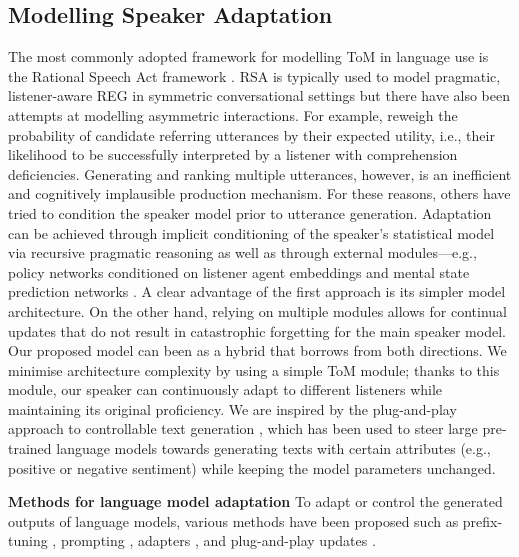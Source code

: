 \subsection{Modelling Speaker Adaptation}
\label{sec:relwork-modelling}
The most commonly adopted framework for modelling ToM in language use is the Rational Speech Act framework \cite{goodman2013knowledge,goodman2016pragmatic}. RSA is typically used to model pragmatic, listener-aware REG in symmetric conversational settings \cite{andreas-klein-2016-reasoning,monroe-etal-2017-colors,cohn-gordon-etal-2018-pragmatically} but there have also been attempts at modelling asymmetric interactions. For example, \citet{bao-etal-2022-learning} reweigh the probability of candidate referring utterances by their expected utility, i.e., their likelihood to be successfully interpreted by a listener with comprehension deficiencies. Generating and ranking multiple utterances, however, is an inefficient and cognitively implausible production mechanism. For these reasons, others have tried to condition the speaker model prior to utterance generation. Adaptation can be achieved through implicit conditioning of the speaker's statistical model via recursive pragmatic reasoning \cite{hawkins2020continual} as well as through external modules---e.g., policy networks conditioned on listener agent embeddings \cite{corona2019modeling} and mental state prediction networks \cite{bara-etal-2021-mindcraft,zhu2021few}. A clear advantage of the first approach is its simpler model architecture. On the other hand, relying on multiple modules allows for continual updates that do not result in catastrophic forgetting for the main speaker model. Our proposed model can been as a hybrid that borrows from both directions. We minimise architecture complexity by using a simple ToM module; thanks to this module, our speaker can continuously adapt to different listeners while maintaining its original proficiency. We are inspired by the plug-and-play approach to controllable text generation \cite{dathathri2020plug}, which has been used to steer large pre-trained language models towards generating texts with certain attributes (e.g., positive or negative sentiment) while keeping the model parameters unchanged.


\textbf{Methods for language model adaptation}
To adapt or control the generated outputs of language models, various methods have been proposed such as prefix-tuning \citep{prefix}, prompting \citep{gpt3}, adapters \citep{houlsby19a, madg}, and plug-and-play updates \citep{dathathri2020plug}.

